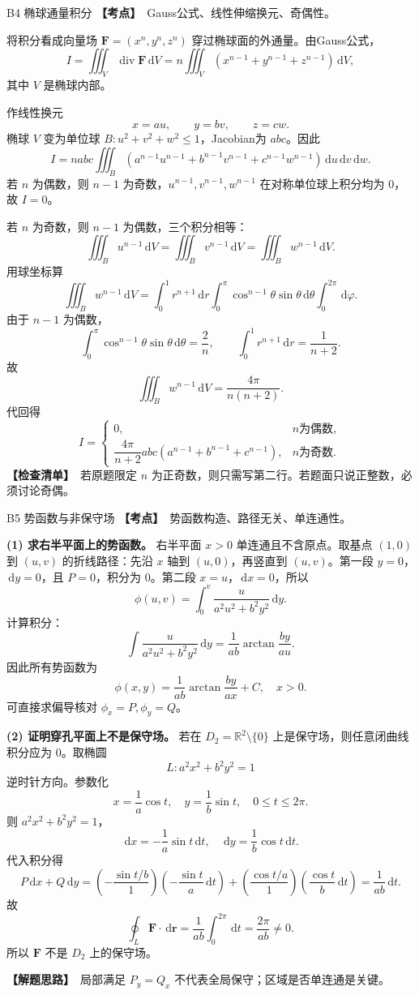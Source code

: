 \documentclass[UTF8,zihao=-4,openany]{ctexbook}
\newcommand{\R}{\mathbb{R}}
\newcommand{\dd}{\,\mathrm{d}}
\newcommand{\diver}{\operatorname{div}}
\newcommand{\thinking}{\textcolor{mainblue}{\bfseries【解题思路】}}
\newcommand{\point}{\textcolor{warnred}{\bfseries【考点】}}
\newcommand{\checklist}{\textcolor{theogreen}{\bfseries【检查清单】}}
\begin{document}
\begin{solutionbox}{B4 椭球通量积分}
\point\ Gauss公式、线性伸缩换元、奇偶性。

将积分看成向量场 $\bm F=(x^n,y^n,z^n)$ 穿过椭球面的外通量。由Gauss公式，
\[
I=\iiint_V\diver\bm F\dd V
=n\iiint_V(x^{n-1}+y^{n-1}+z^{n-1})\dd V,
\]
其中 $V$ 是椭球内部。

作线性换元
\[
x=au,
\qquad y=bv,
\qquad z=cw.
\]
椭球 $V$ 变为单位球 $B:u^2+v^2+w^2\le1$，Jacobian为 $abc$。因此
\[
I=nabc\iiint_B(a^{n-1}u^{n-1}+b^{n-1}v^{n-1}+c^{n-1}w^{n-1})\dd u\dd v\dd w.
\]
若 $n$ 为偶数，则 $n-1$ 为奇数，$u^{n-1},v^{n-1},w^{n-1}$ 在对称单位球上积分均为 $0$，故 $I=0$。

若 $n$ 为奇数，则 $n-1$ 为偶数，三个积分相等：
\[
\iiint_Bu^{n-1}\dd V=\iiint_Bv^{n-1}\dd V=\iiint_Bw^{n-1}\dd V.
\]
用球坐标算
\[
\iiint_Bw^{n-1}\dd V
=\int_0^1r^{n+1}\dd r\int_0^\pi\cos^{n-1}\theta\sin\theta\dd\theta\int_0^{2\pi}\dd\varphi.
\]
由于 $n-1$ 为偶数，
\[
\int_0^\pi\cos^{n-1}\theta\sin\theta\dd\theta=\frac2n,
\qquad
\int_0^1r^{n+1}\dd r=\frac1{n+2}.
\]
故
\[
\iiint_Bw^{n-1}\dd V=\frac{4\pi}{n(n+2)}.
\]
代回得
\[
\boxed{
I=\begin{cases}
0,&n\text{为偶数},\\[2mm]
\dfrac{4\pi}{n+2}abc(a^{n-1}+b^{n-1}+c^{n-1}),&n\text{为奇数}.
\end{cases}}
\]
\checklist\ 若原题限定 $n$ 为正奇数，则只需写第二行。若题面只说正整数，必须讨论奇偶。
\end{solutionbox}

\begin{solutionbox}{B5 势函数与非保守场}
\point\ 势函数构造、路径无关、单连通性。

\textbf{(1) 求右半平面上的势函数。} 右半平面 $x>0$ 单连通且不含原点。取基点 $(1,0)$ 到 $(u,v)$ 的折线路径：先沿 $x$ 轴到 $(u,0)$，再竖直到 $(u,v)$。第一段 $y=0$，$\dd y=0$，且 $P=0$，积分为 $0$。第二段 $x=u$，$\dd x=0$，所以
\[
\phi(u,v)=\int_0^v\frac{u}{a^2u^2+b^2y^2}\dd y.
\]
计算积分：
\[
\int\frac{u}{a^2u^2+b^2y^2}\dd y
=\frac1{ab}\arctan\frac{by}{au}.
\]
因此所有势函数为
\[
\boxed{\phi(x,y)=\frac1{ab}\arctan\frac{by}{ax}+C,
\quad x>0.}
\]
可直接求偏导核对 $\phi_x=P,\phi_y=Q$。

\textbf{(2) 证明穿孔平面上不是保守场。} 若在 $D_2=\R^2\setminus\{0\}$ 上是保守场，则任意闭曲线积分应为 $0$。取椭圆
\[
L:a^2x^2+b^2y^2=1
\]
逆时针方向。参数化
\[
x=\frac1a\cos t,
\quad y=\frac1b\sin t,
\quad 0\le t\le2\pi.
\]
则 $a^2x^2+b^2y^2=1$，
\[
\dd x=-\frac1a\sin t\dd t,
\quad
\dd y=\frac1b\cos t\dd t.
\]
代入积分得
\[
P\dd x+Q\dd y
=\left(-\frac{\sin t/b}{1}\right)\left(-\frac{\sin t}{a}\dd t\right)
+\left(\frac{\cos t/a}{1}\right)\left(\frac{\cos t}{b}\dd t\right)
=\frac1{ab}\dd t.
\]
故
\[
\oint_L\bm F\cdot\dd\bm r=\frac1{ab}\int_0^{2\pi}\dd t=\frac{2\pi}{ab}\ne0.
\]
所以 $\bm F$ 不是 $D_2$ 上的保守场。

\thinking\ 局部满足 $P_y=Q_x$ 不代表全局保守；区域是否单连通是关键。
\end{solutionbox}
\end{document}
